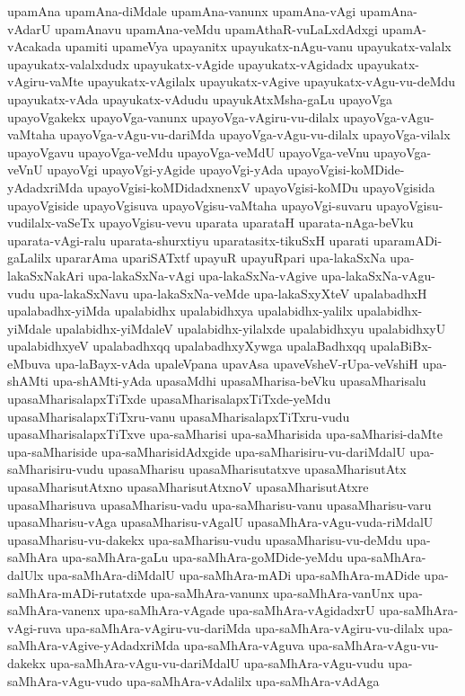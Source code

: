 {upamAna
upamAna-diMdale
upamAna-vanunx
upamAna-vAgi
upamAna-vAdarU
upamAnavu
upamAna-veMdu
upamAthaR-vuLaLxdAdxgi
upamA-vAcakada
upamiti
upameVya
upayanitx
upayukatx-nAgu-vanu
upayukatx-valalx
upayukatx-valalxdudx
upayukatx-vAgide
upayukatx-vAgidadx
upayukatx-vAgiru-vaMte
upayukatx-vAgilalx
upayukatx-vAgive
upayukatx-vAgu-vu-deMdu
upayukatx-vAda
upayukatx-vAdudu
upayukAtxMsha-gaLu
upayoVga
upayoVgakekx
upayoVga-vanunx
upayoVga-vAgiru-vu-dilalx
upayoVga-vAgu-vaMtaha
upayoVga-vAgu-vu-dariMda
upayoVga-vAgu-vu-dilalx
upayoVga-vilalx
upayoVgavu
upayoVga-veMdu
upayoVga-veMdU
upayoVga-veVnu
upayoVga-veVnU
upayoVgi
upayoVgi-yAgide
upayoVgi-yAda
upayoVgisi-koMDide-yAdadxriMda
upayoVgisi-koMDidadxnenxV
upayoVgisi-koMDu
upayoVgisida
upayoVgiside
upayoVgisuva
upayoVgisu-vaMtaha
upayoVgi-suvaru
upayoVgisu-vudilalx-vaSeTx
upayoVgisu-vevu
uparata
uparataH
uparata-nAga-beVku
uparata-vAgi-ralu
uparata-shurxtiyu
uparatasitx-tikuSxH
uparati
uparamADi-gaLalilx
upararAma
upariSATxtf
upayuR
upayuRpari
upa-lakaSxNa
upa-lakaSxNakAri
upa-lakaSxNa-vAgi
upa-lakaSxNa-vAgive
upa-lakaSxNa-vAgu-vudu
upa-lakaSxNavu
upa-lakaSxNa-veMde
upa-lakaSxyXteV
upalabadhxH
upalabadhx-yiMda
upalabidhx
upalabidhxya
upalabidhx-yalilx
upalabidhx-yiMdale
upalabidhx-yiMdaleV
upalabidhx-yilalxde
upalabidhxyu
upalabidhxyU
upalabidhxyeV
upalabadhxqq
upalabadhxyXywga
upalaBadhxqq
upalaBiBx-eMbuva
upa-laBayx-vAda
upaleVpana
upavAsa
upaveVsheV-rUpa-veVshiH
upa-shAMti
upa-shAMti-yAda
upasaMdhi
upasaMharisa-beVku
upasaMharisalu
upasaMharisalapxTiTxde
upasaMharisalapxTiTxde-yeMdu
upasaMharisalapxTiTxru-vanu
upasaMharisalapxTiTxru-vudu
upasaMharisalapxTiTxve
upa-saMharisi
upa-saMharisida
upa-saMharisi-daMte
upa-saMhariside
upa-saMharisidAdxgide
upa-saMharisiru-vu-dariMdalU
upa-saMharisiru-vudu
upasaMharisu
upasaMharisutatxve
upasaMharisutAtx
upasaMharisutAtxno
upasaMharisutAtxnoV
upasaMharisutAtxre
upasaMharisuva
upasaMharisu-vadu
upa-saMharisu-vanu
upasaMharisu-varu
upasaMharisu-vAga
upasaMharisu-vAgalU
upasaMhAra-vAgu-vuda-riMdalU
upasaMharisu-vu-dakekx
upa-saMharisu-vudu
upasaMharisu-vu-deMdu
upa-saMhAra
upa-saMhAra-gaLu
upa-saMhAra-goMDide-yeMdu
upa-saMhAra-dalUlx
upa-saMhAra-diMdalU
upa-saMhAra-mADi
upa-saMhAra-mADide
upa-saMhAra-mADi-rutatxde
upa-saMhAra-vanunx
upa-saMhAra-vanUnx
upa-saMhAra-vanenx
upa-saMhAra-vAgade
upa-saMhAra-vAgidadxrU
upa-saMhAra-vAgi-ruva
upa-saMhAra-vAgiru-vu-dariMda
upa-saMhAra-vAgiru-vu-dilalx
upa-saMhAra-vAgive-yAdadxriMda
upa-saMhAra-vAguva
upa-saMhAra-vAgu-vu-dakekx
upa-saMhAra-vAgu-vu-dariMdalU
upa-saMhAra-vAgu-vudu
upa-saMhAra-vAgu-vudo
upa-saMhAra-vAdalilx
upa-saMhAra-vAdAga
}
